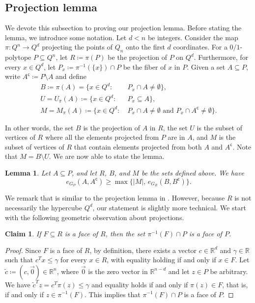 \documentclass[11pt,a4paper,oneside,reqno]{amsart}
\newtheorem{lemma}[theorem]{Lemma}
\newtheorem{claim}[theorem]{Claim}
\newcommand{\RR}{\mathbb{R}}
\begin{document}
\subsection{Projection lemma}\label{subsec:projection}

We devote this subsection to proving our projection lemma. Before stating the lemma, we introduce some notation. Let $d<n$ be integers. Consider the map $\pi \colon Q^n\rightarrow Q^d$ projecting the points of $Q_n$ onto the first $d$ coordinates.
For a $0/1$-polytope $P\subseteq Q^n$, let $R \coloneqq \pi(P)$ be the projection of $P$ on $Q^d$. Furthermore, for every $x \in Q^d$, let $P_x \coloneqq \pi^{-1}(\{x\}) \cap P$ be the fiber of $x$ in $P$.
Given a set $A\subseteq P$, write $A^{\mathsf{c}} \coloneqq P \setminus A$ and define
\begin{equation}\label{eq:BUM}
  \begin{split}
    B\coloneqq \pi(A)=\{x\in Q^d:\: & P_x \cap A \neq \emptyset\}, \\
    U = U_{\pi}(A)\coloneqq\{x\in Q^d:\: & P_x \subseteq A\}, \\
    M = M_{\pi}(A)\coloneqq\{x\in Q^d:\: & P_x \cap A\neq \emptyset \text{ and } P_x \cap A^\mathsf{c}\neq \emptyset\}.
  \end{split}
\end{equation}

In other words, the set $B$ is the projection of $A$ in $R$, the set $U$ is the subset of vertices of $R$ where all the elements projected from $P$ are in $A$, and $M$ is the subset of vertices of $R$ that contain elements projected from both $A$ and $A^{\mathsf{c}}$. Note that $M = B \setminus U$. We are now able to state the lemma.

\begin{lemma}\label{lem:projection}
  Let $A \subseteq P$, and let $R$, $B$, and $M$ be the sets defined above.
  We have
  \[
    e_{G_P}(A,A^{\mathsf{c}})\geq \max\bigl\{|M| ,\, e_{G_R}(B,B^\mathsf{c})\bigr\}.
  \]
\end{lemma}

We remark that  is similar to the projection lemma in \cite{randomexppolytopes24}. However, because $R$ is not necessarily the hypercube $Q^d$, our statement is slightly more technical. We start with the following geometric observation about projections. 

\begin{claim}\label{clm:face}
  If $F\subseteq R$ is a face of $R$, then the set $\pi^{-1}(F)\cap P$ is a face of $P$.
\end{claim}
\begin{proof}
  Since $F$ is a face of $R$, by definition, there exists a vector $c\in \RR^d$ and $\gamma \in \RR$ such that $c^Tx\leq \gamma$ for every $x\in R$, with equality holding if and only if $x\in F$.
  Let $\tilde{c} \coloneqq (c,\vec{0}) \in \RR^n$, where $\vec{0}$ is the zero vector in $\RR^{n-d}$ and let $z \in P$ be arbitrary.
  We have $\tilde{c}^T z = c^T \pi(z) \le \gamma$ and equality holds if and only if $\pi(z) \in F$, that is, if and only if $z \in \pi^{-1}(F)$.  This implies that $\pi^{-1}(F) \cap P$ is a face of $P$.
\end{proof}
\end{document}
